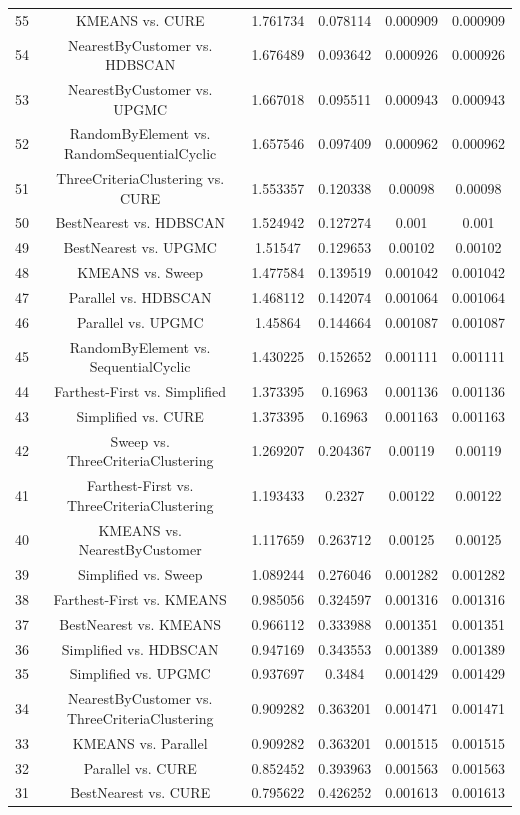 \documentclass[a4paper,10pt]{article}
\begin{document}
\begin{landscape}
\begin{table}[!htp]
\begin{tabular}{cccccc}
55&KMEANS vs. CURE&1.761734&0.078114&0.000909&0.000909\\
54&NearestByCustomer vs. HDBSCAN&1.676489&0.093642&0.000926&0.000926\\
53&NearestByCustomer vs. UPGMC&1.667018&0.095511&0.000943&0.000943\\
52&RandomByElement vs. RandomSequentialCyclic&1.657546&0.097409&0.000962&0.000962\\
51&ThreeCriteriaClustering vs. CURE&1.553357&0.120338&0.00098&0.00098\\
50&BestNearest vs. HDBSCAN&1.524942&0.127274&0.001&0.001\\
49&BestNearest vs. UPGMC&1.51547&0.129653&0.00102&0.00102\\
48&KMEANS vs. Sweep&1.477584&0.139519&0.001042&0.001042\\
47&Parallel vs. HDBSCAN&1.468112&0.142074&0.001064&0.001064\\
46&Parallel vs. UPGMC&1.45864&0.144664&0.001087&0.001087\\
45&RandomByElement vs. SequentialCyclic&1.430225&0.152652&0.001111&0.001111\\
44&Farthest-First vs. Simplified&1.373395&0.16963&0.001136&0.001136\\
43&Simplified vs. CURE&1.373395&0.16963&0.001163&0.001163\\
42&Sweep vs. ThreeCriteriaClustering&1.269207&0.204367&0.00119&0.00119\\
41&Farthest-First vs. ThreeCriteriaClustering&1.193433&0.2327&0.00122&0.00122\\
40&KMEANS vs. NearestByCustomer&1.117659&0.263712&0.00125&0.00125\\
39&Simplified vs. Sweep&1.089244&0.276046&0.001282&0.001282\\
38&Farthest-First vs. KMEANS&0.985056&0.324597&0.001316&0.001316\\
37&BestNearest vs. KMEANS&0.966112&0.333988&0.001351&0.001351\\
36&Simplified vs. HDBSCAN&0.947169&0.343553&0.001389&0.001389\\
35&Simplified vs. UPGMC&0.937697&0.3484&0.001429&0.001429\\
34&NearestByCustomer vs. ThreeCriteriaClustering&0.909282&0.363201&0.001471&0.001471\\
33&KMEANS vs. Parallel&0.909282&0.363201&0.001515&0.001515\\
32&Parallel vs. CURE&0.852452&0.393963&0.001563&0.001563\\
31&BestNearest vs. CURE&0.795622&0.426252&0.001613&0.001613\\

\end{tabular}
\end{table}
\end{landscape}
\end{document}
